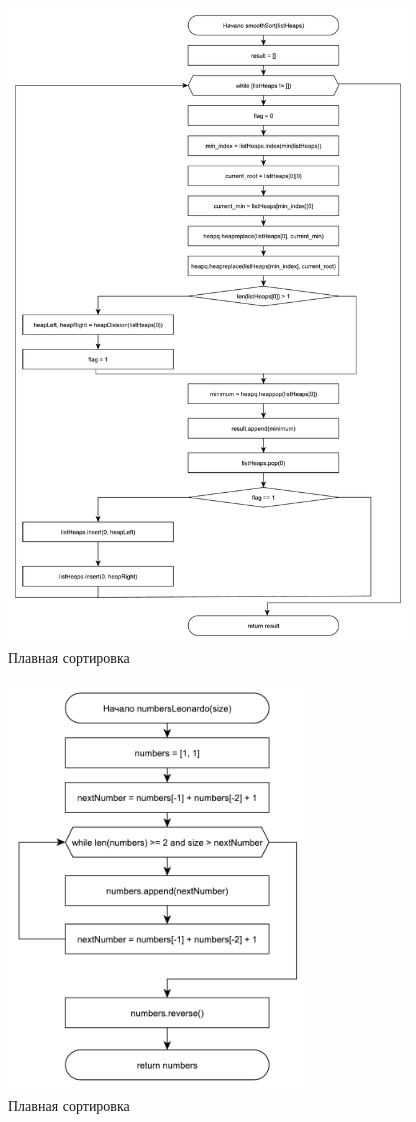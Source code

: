 \documentclass[12pt,a4paper]{scrartcl}
\begin{document}
		\begin{figure}[H]
			\centering
			\includegraphics[width=400px]{3.pdf}
			\caption{Плавная сортировка}
			\label{graph2.4}
		\end{figure}

		\begin{figure}[H]
			\centering
			\includegraphics[width=300px]{31.pdf}
			\caption{Плавная сортировка}
			\label{graph2.5}
		\end{figure}
\end{document}
